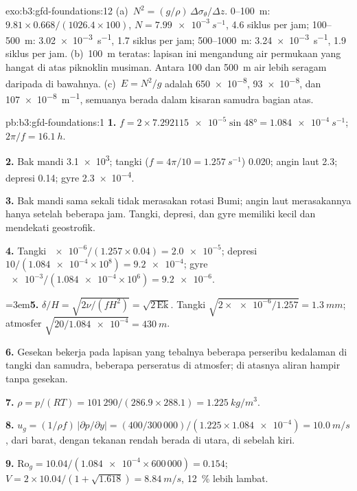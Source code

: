 \begin{solution}{exo:b3:gfd-foundations:12}
(a)~$N^2 = (g/\rho)\,\Delta\sigma_\theta/\Delta z$. 0--\qty{100}{m}:
$9.81\times0.668/(1026.4\times100)$, $N = \qty{7.99e-3}{s^{-1}}$, 4.6
siklus per jam; 100--\qty{500}{m}: \qty{3.02e-3}{s^{-1}}, 1.7 siklus per
jam; 500--\qty{1000}{m}: \qty{3.24e-3}{s^{-1}}, 1.9 siklus per jam.
(b)~\qty{100}{m} teratas: lapisan ini mengandung air permukaan yang hangat di atas
piknoklin musiman. Antara 100 dan \qty{500}{m} air lebih
seragam daripada di bawahnya. (c)~$E = N^2/g$ adalah \num{650e-8}, \num{93e-8}, dan
\qty{107e-8}{m^{-1}}, semuanya berada dalam kisaran samudra bagian atas.
\end{solution}

\begin{solution}{pb:b3:gfd-foundations:1}
\textbf{1.} $f = 2\times\num{7.292115e-5}\sin\ang{48} =
\qty{1.084e-4}{s^{-1}}$; $2\pi/f = \qty{16.1}{h}$.

\textbf{2.} Bak mandi \num{3.1e3}; tangki ($f = 4\pi/10 = \qty{1.257}{s^{-1}}$)
0.020; angin laut 2.3; depresi 0.14; gyre \num{2.3e-4}.

\textbf{3.} Bak mandi sama sekali tidak merasakan rotasi Bumi; angin laut
merasakannya hanya setelah beberapa jam. Tangki, depresi, dan gyre memiliki
 kecil dan mendekati geostrofik.

\textbf{4.} Tangki $\num{e-6}/(1.257\times0.04) = \num{2.0e-5}$; depresi
$10/(\num{1.084e-4}\times10^8) = \num{9.2e-4}$; gyre
$\num{e-3}/(\num{1.084e-4}\times10^6) = \num{9.2e-6}$.

\begingroup\emergencystretch=3em\relax \textbf{5.} $\delta/H = \sqrt{2\nu/(fH^2)} = \sqrt{2\,\mathrm{Ek}}$. Tangki
$\sqrt{2\times\num{e-6}/1.257} = \qty{1.3}{mm}$; atmosfer $\sqrt{20/\num{1.084e-4}}
= \qty{430}{m}$.
\par\endgroup
\textbf{6.} Gesekan bekerja pada lapisan yang tebalnya beberapa perseribu kedalaman di
tangki dan samudra, beberapa perseratus di atmosfer; di atasnya aliran
hampir tanpa gesekan.

\textbf{7.} $\rho = p/(RT) = 101\,290/(286.9\times288.1) =
\qty{1.225}{kg/m^3}$.

\textbf{8.} $u_g = (1/\rho f)\,|\partial p/\partial y| = (400/300\,000)/(1.225
\times\num{1.084e-4}) = \qty{10.0}{m/s}$, dari barat, dengan tekanan rendah
berada di utara, di sebelah kiri.

\textbf{9.} $\mathrm{Ro}_g = 10.04/(\num{1.084e-4}\times600\,000) = 0.154$;
$V = 2\times10.04/(1 + \sqrt{1.618}) = \qty{8.84}{m/s}$, \qty{12}{\percent}
lebih lambat.


\end{solution}
